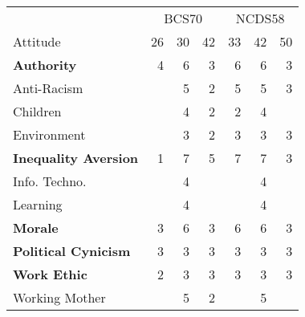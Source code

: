 \begin{tabular}{lrrrrrr}
\toprule
\multicolumn{1}{c}{} & \multicolumn{3}{c}{BCS70} & \multicolumn{3}{c}{NCDS58} \\
\cmidrule(l{3pt}r{3pt}){2-4} \cmidrule(l{3pt}r{3pt}){5-7}
Attitude & 26 & 30 & 42 & 33 & 42 & 50\\
\midrule
\textbf{Authority} & 4 & 6 & 3 & 6 & 6 & 3\\
Anti-Racism &  & 5 & 2 & 5 & 5 & 3\\
Children &  & 4 & 2 & 2 & 4 & \\
Environment &  & 3 & 2 & 3 & 3 & 3\\
\textbf{Inequality Aversion} & 1 & 7 & 5 & 7 & 7 & 3\\
Info. Techno. &  & 4 &  &  & 4 & \\
Learning &  & 4 &  &  & 4 & \\
\textbf{Morale} & 3 & 6 & 3 & 6 & 6 & 3\\
\textbf{Political Cynicism} & 3 & 3 & 3 & 3 & 3 & 3\\
\textbf{Work Ethic} & 2 & 3 & 3 & 3 & 3 & 3\\
Working Mother &  & 5 & 2 &  & 5 & \\
\bottomrule
\end{tabular}